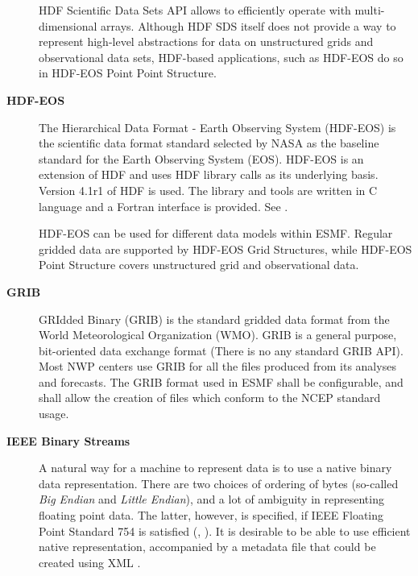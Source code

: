 \begin{description}
HDF Scientific Data Sets API allows to efficiently operate with
multi-dimensional arrays. Although HDF SDS itself does not provide a way
to represent high-level abstractions for data on unstructured grids
and observational data sets, HDF-based applications, such as HDF-EOS
do so in HDF-EOS Point Point Structure.




\item[\bf HDF-EOS]  The Hierarchical Data Format - Earth Observing
System (HDF-EOS) is the scientific data format standard selected by
NASA as the baseline standard for the Earth Observing System (EOS). HDF-EOS
is an extension of HDF and uses HDF library calls as its underlying
basis. Version 4.1r1 of HDF is used. The library and tools are written
in C language and a Fortran interface is provided. See \cite{HDF-EOS}.

HDF-EOS can be used for different data models within ESMF. Regular
gridded data are supported by HDF-EOS Grid Structures, while HDF-EOS  
Point Structure covers unstructured grid and observational data.


\item[\bf GRIB] 
GRIdded Binary (GRIB) is the standard gridded data format from the
World Meteorological Organization (WMO).  GRIB is a general purpose,
bit-oriented data exchange format (There is no any standard GRIB API).
Most NWP centers use GRIB for all the files produced from its analyses and 
forecasts.  The GRIB format used in ESMF shall be configurable, and shall 
allow the creation of files which conform to the NCEP standard usage.  



\item[\bf IEEE Binary Streams]
A natural way for a machine to represent data is to use a native binary data 
representation. There are  two choices of ordering of 
bytes (so-called {\it Big Endian} and {\it Little Endian}), and a lot of
ambiguity in representing floating point data. The latter, however, is
specified, if IEEE Floating Point Standard 754 is satisfied 
(\cite{IEEE-Floating-Point}, \cite{Kahan-IEEE-754}). It is
desirable to be able to use efficient native representation,
accompanied by a metadata file that could be created using XML \cite{XML-W3C}. 


\end{description}
